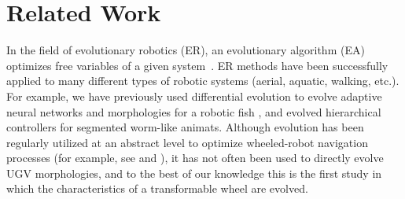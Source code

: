 \section{Related Work}
\label{sec:related-work}



In the field of evolutionary robotics (ER), an evolutionary algorithm (EA) optimizes free variables of a given system~\citep{Silva.EvolComp.Issues-ER.2016}.
%
ER methods have been successfully applied to many different types of robotic systems (aerial, aquatic, walking, etc.).
%
For example, we have previously used differential evolution to evolve adaptive neural networks and morphologies for a robotic fish \citep{Clark.GECCO.MFAC.2015,Clark.2015.BB.EvolutionaryMultiobjectiveDesign}, and \citet{Moore.2017.GECCO.Animat} evolved hierarchical controllers for segmented worm-like animats.
%
Although evolution has been regularly utilized at an abstract level to optimize wheeled-robot navigation processes (for example, see \citet{Gomes.2015.GECCO.Maze} and \citet{Lehman.2011.EC.AbandoningObjectivesEvolution}), it has not often been used to directly evolve UGV morphologies, and to the best of our knowledge this is the first study in which the characteristics of a transformable wheel are evolved.
%


